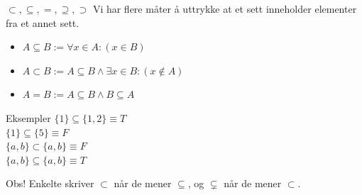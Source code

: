 \begin{frame}{$\subset, \subseteq, =, \supseteq, \supset$}
    Vi har flere måter å uttrykke at et sett inneholder elementer fra et annet sett.
    \begin{itemize}
        \item $A \subseteq B := \forall x \in A : (x \in B)$
        \item $A \subset B := A \subseteq B \land \exists x \in B : (x \notin A)$
        \item $A = B := A \subseteq B \land B \subseteq A$
    \end{itemize}
    \pause
    \begin{block}{Eksempler}
        $\{1\} \subseteq \{1, 2\} \equiv T$\\
        $\{1\} \subseteq \{5\} \equiv F$\\
        $\{a, b\} \subset \{a, b\} \equiv F$\\
        $\{a, b\} \subseteq \{a, b\} \equiv T$
    \end{block}
    \pause
    \centering
    Obs! Enkelte skriver $\subset$ når de mener $\subseteq$, og $\subsetneq$ når de mener $\subset$.
\end{frame}


